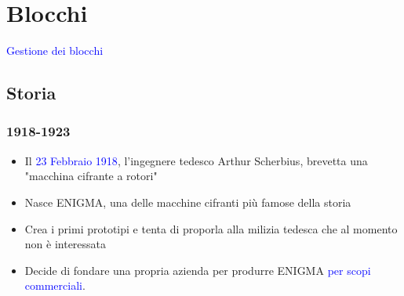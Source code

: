 \section{Blocchi}

	\begin{frame}
		\begin{center}
			\LARGE{\textcolor{blue}{Gestione dei blocchi}}
		\end{center}
	\end{frame}

	\subsection{Storia}
	
		\begin{frame}
			\frametitle{1918-1923}		
			\begin{itemize}
				\item Il \textcolor{blue}{23 Febbraio 1918}, l'ingegnere tedesco \alert{Arthur Scherbius}, brevetta una "macchina cifrante a rotori"
				\item Nasce \alert{ENIGMA}, una delle macchine cifranti più famose della storia
				\item Crea i primi prototipi e tenta di proporla alla milizia tedesca che al momento non è interessata
				\item Decide di fondare una propria azienda per produrre ENIGMA \textcolor{blue}{per scopi commerciali}. 
			\end{itemize}
		\end{frame}

